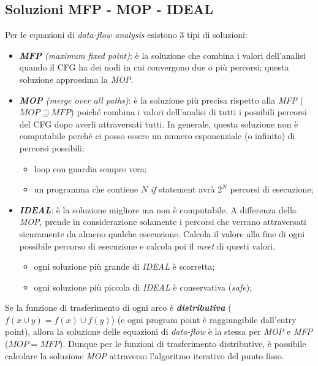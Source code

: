 \documentclass{article}
\begin{document}
        \newpage
        \subsection{Soluzioni MFP - MOP - IDEAL}
            Per le equazioni di \textit{data-flow analysis} esistono 3 tipi di soluzioni:
            \begin{itemize}
                \item \textit{\textbf{MFP} (maximum fixed point)}: è la soluzione che combina i valori dell'analisi quando il CFG ha dei nodi in cui convergono due o più percorsi; questa soluzione approssima la \textit{MOP}.
                \item \textit{\textbf{MOP} (merge over all paths)}: è la soluzione più precisa rispetto alla \textit{MFP} ($MOP \sqsupseteq MFP$) poiché combina i valori dell'analisi di tutti i possibili percorsi del CFG dopo averli attraversati tutti. In generale, questa soluzione non è computabile perché ci posso essere un numero esponenziale (o infinito) di percorsi possibili:
                \begin{itemize}
                    \item loop con guardia sempre vera;
                    \item un programma che contiene $N$ \textit{if} statement avrà $2^N$ percorsi di esecuzione;
                \end{itemize}
                \item \textbf{\textit{IDEAL}}: è la soluzione migliore ma non è computabile. A differenza della \textit{MOP}, prende in considerazione solamente i percorsi che verrano attraversati sicuramente da almeno qualche esecuzione. Calcola il valore alla fine di ogni possibile percorso di esecuzione e calcola poi il \textit{meet} di questi valori.
                \begin{itemize}
                    \item ogni soluzione più grande di \textit{IDEAL} è scorretta;
                    \item ogni soluzione più piccola di \textit{IDEAL} è conservativa (\textit{safe});
                \end{itemize}
            \end{itemize}
            Se la funzione di trasferimento di ogni arco è \textbf{\textit{distributiva}} ($f(x \cup y) = f(x) \cup f(y)$) (e ogni program point è raggiungibile dall'entry point), allora la soluzione delle equazioni di \textit{data-flow} è la stessa per \textit{MOP} e \textit{MFP} ($MOP = MFP$). Dunque per le funzioni di trasferimento distributive, è possibile calcolare la soluzione \textit{MOP} attraverso l'algoritmo iterativo del punto fisso.\\
\end{document}
